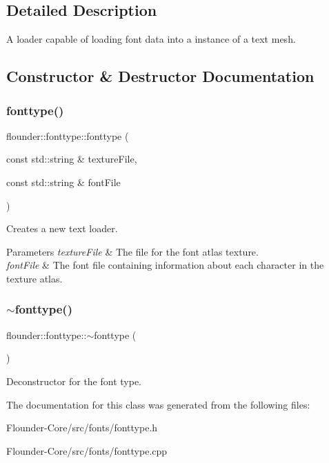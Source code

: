 \subsection{Detailed Description}
A loader capable of loading font data into a instance of a text mesh. 



\subsection{Constructor \& Destructor Documentation}
\mbox{\label{classflounder_1_1fonttype_a2f0a1a364c9bc3160b54f9187975fc9d}} 
\subsubsection{\texorpdfstring{fonttype()}{fonttype()}}
{\footnotesize\ttfamily flounder\+::fonttype\+::fonttype (\begin{DoxyParamCaption}\item[{const std\+::string \&}]{texture\+File,  }\item[{const std\+::string \&}]{font\+File }\end{DoxyParamCaption})}



Creates a new text loader. 


\begin{DoxyParams}{Parameters}
{\em texture\+File} & The file for the font atlas texture. \\
\hline
{\em font\+File} & The font file containing information about each character in the texture atlas. \\
\hline
\end{DoxyParams}
\mbox{\label{classflounder_1_1fonttype_a666d1dbc560c0c308dab930e62a3332f}} 
\subsubsection{\texorpdfstring{$\sim$fonttype()}{~fonttype()}}
{\footnotesize\ttfamily flounder\+::fonttype\+::$\sim$fonttype (\begin{DoxyParamCaption}{ }\end{DoxyParamCaption})}



Deconstructor for the font type. 



The documentation for this class was generated from the following files\+:\begin{DoxyCompactItemize}
\item 
Flounder-\/\+Core/src/fonts/fonttype.\+h\item 
Flounder-\/\+Core/src/fonts/fonttype.\+cpp\end{DoxyCompactItemize}
